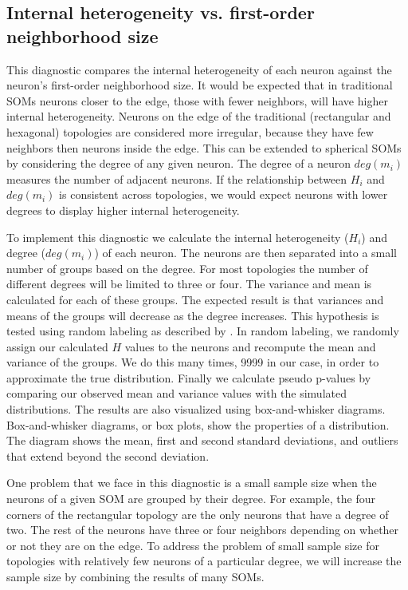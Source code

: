 \subsection{Internal heterogeneity vs. first-order neighborhood size}
\label{q1}
This diagnostic compares the internal heterogeneity of each neuron against
the neuron's first-order neighborhood size.  It would be expected that in
traditional SOMs neurons closer to the edge, those with fewer neighbors, will
have higher internal heterogeneity. Neurons on the edge of the traditional
(rectangular and hexagonal) topologies are considered more irregular, because
they have few neighbors then neurons inside the edge.  This can be extended to
spherical SOMs by considering the degree of any given neuron.  The degree of a
neuron $deg(m_i)$ measures the number of adjacent neurons.  If the
relationship between $H_i$ and $deg(m_i)$ is consistent across topologies,
we would expect neurons with lower degrees to display higher internal heterogeneity.

To implement this diagnostic we calculate the internal heterogeneity ($H_i$)
and degree ($deg(m_i)$) of each neuron. The neurons are then separated into a small number of
groups based on the degree.  For most topologies the number of
different degrees will be limited to three or four.  The variance and mean
is calculated for each of these groups.  The expected result is that
variances and means of the groups will decrease as the degree increases.  This
hypothesis is tested using random labeling as described by \cite{siss2004}.
In random labeling, we randomly assign our calculated $H$ values to the
neurons and recompute the mean and variance of the groups.  We do this many times,
9999 in our case, in order to approximate the true distribution. Finally we
calculate pseudo p-values by comparing our observed mean and variance values
with the simulated distributions.  The results are also visualized using
box-and-whisker diagrams. Box-and-whisker diagrams, or box plots, show the
properties of a distribution.  The diagram shows the mean, first and second
standard deviations, and outliers that extend beyond the second deviation.

One problem that we face in this diagnostic is a small sample size when the neurons of a given
SOM are grouped by their degree.  For example, the four corners of the
rectangular topology are the only neurons that have a degree of two.  The rest
of the neurons have three or four neighbors depending on whether or not they
are on the edge. To address the problem of small sample size for topologies
with relatively few neurons of a particular degree, we will increase
the sample size by combining the results of many SOMs.

